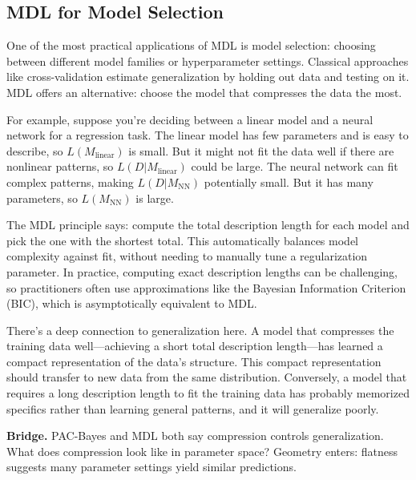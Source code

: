 \subsection{MDL for Model Selection}

One of the most practical applications of MDL is model selection: choosing between different model families or hyperparameter settings. Classical approaches like cross-validation estimate generalization by holding out data and testing on it. MDL offers an alternative: choose the model that compresses the data the most.

\vspace{0.3cm}

For example, suppose you're deciding between a linear model and a neural network for a regression task. The linear model has few parameters and is easy to describe, so $L(M_{\text{linear}})$ is small. But it might not fit the data well if there are nonlinear patterns, so $L(D|M_{\text{linear}})$ could be large. The neural network can fit complex patterns, making $L(D|M_{\text{NN}})$ potentially small. But it has many parameters, so $L(M_{\text{NN}})$ is large.

\vspace{0.3cm}

The MDL principle says: compute the total description length for each model and pick the one with the shortest total. This automatically balances model complexity against fit, without needing to manually tune a regularization parameter. In practice, computing exact description lengths can be challenging, so practitioners often use approximations like the Bayesian Information Criterion (BIC), which is asymptotically equivalent to MDL.

\vspace{0.3cm}

There's a deep connection to generalization here. A model that compresses the training data well---achieving a short total description length---has learned a compact representation of the data's structure. This compact representation should transfer to new data from the same distribution. Conversely, a model that requires a long description length to fit the training data has probably memorized specifics rather than learning general patterns, and it will generalize poorly.

\vspace{2em}


\vspace{0.8em}
\textbf{Bridge.} PAC\mbox{-}Bayes and MDL both say compression controls generalization. What does compression look like in parameter space? Geometry enters: flatness suggests many parameter settings yield similar predictions.
\vspace{0.8em}


